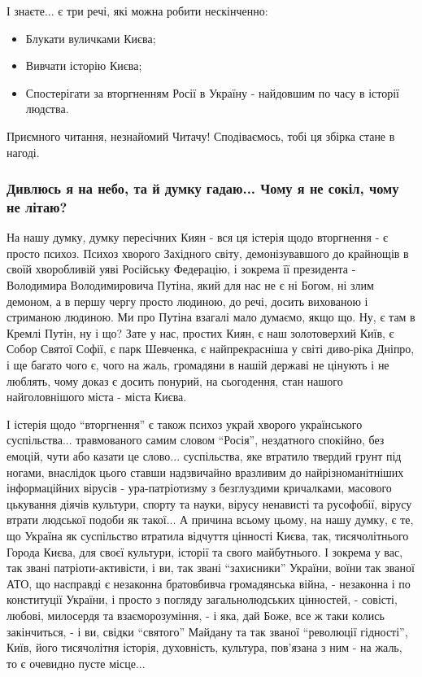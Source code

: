І знаєте... є три речі, які можна робити нескінченно:

\begin{itemize} %
\item Блукати вуличками Києва;
\item Вивчати історію Києва;
\item Спостерігати за вторгненням Росії в Україну - найдовшим по часу в історії людства.
\end{itemize} %

Приємного читання, незнайомий Читачу! Сподіваємось, тобі ця збірка стане в нагоді.

\clearpage
\subsubsection{Дивлюсь я на небо, та й думку гадаю... Чому я не сокіл, чому не
літаю?}

На нашу думку, думку пересічних Киян - вся ця істерія щодо вторгнення - є
просто психоз. Психоз хворого Західного світу, демонізувавшого до крайнощів в
своїй хворобливій уяві Російську Федерацію, і зокрема її президента -
Володимира Володимировича Путіна, який для нас не є ні Богом, ні злим демоном,
а в першу чергу просто людиною, до речі, досить вихованою і стриманою людиною.
Ми про Путіна взагалі мало думаємо, якщо що. Ну, є там в Кремлі Путін, ну і що?
Зате у нас, простих Киян, є наш золотоверхий Київ, є Собор Святої Софії, є парк
Шевченка, є найпрекрасніша у світі диво-ріка Дніпро, і ще багато чого є, чого
на жаль, громадяни в нашій державі не цінують і не люблять, чому доказ є досить
понурий, на сьогодення, стан нашого найголовнішого міста - міста Києва.

І істерія щодо \enquote{вторгнення} є також психоз украй хворого українського
суспільства... травмованого самим словом \enquote{Росія}, нездатного спокійно,
без емоцій, чути або казати це слово... суспільства, яке втратило твердий грунт
під ногами, внаслідок цього ставши надзвичайно вразливим до найрізноманітніших
інформаційних вірусів - ура-патріотизму з безглуздими кричалками, масового
цькування діячів культури, спорту та науки, вірусу ненависті та русофобії,
вірусу втрати людської подоби як такої... А причина всьому цьому, на нашу
думку, є те, що Україна як суспільство втратила відчуття цінності Києва, так,
тисячолітнього Города Києва, для своєї культури, історії та свого майбутнього.
І зокрема у вас, так звані патріоти-активісти, і ви, так звані
\enquote{захисники} України, воїни так званої АТО, що насправді є незаконна
братовбивча громадянська війна, - незаконна і по конституції України, і просто
з погляду загальнолюдських цінностей, - совісті, любові, милосердя та
взаєморозуміння, - і яка, дай Боже, все ж таки колись закінчиться, - і ви,
свідки \enquote{святого} Майдану та так званої \enquote{революції гідності},
Київ, його тисячолітня історія, духовність, культура, пов'язана з ним - на
жаль, то є очевидно пусте місце...

